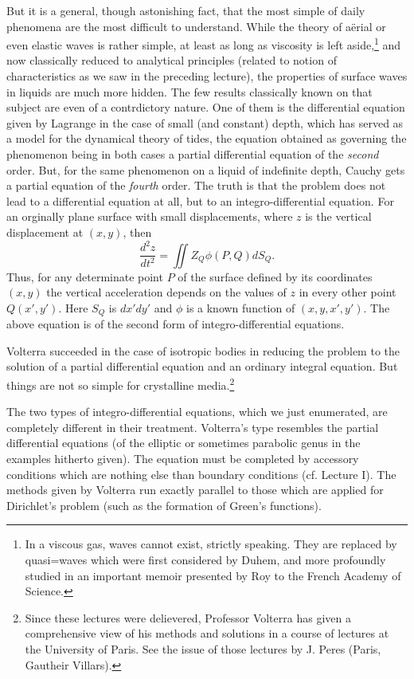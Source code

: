 \documentclass[12pt,oneside]{book}
\newcommand{\iit}[1]{\textit{#1}}
\begin{document}
But it is a general, though astonishing fact, that the most simple of daily phenomena are the most difficult to understand. While the theory of a\"erial or even elastic waves is rather simple, at least as long as viscosity is left aside,\footnote{In a viscous gas, waves cannot exist, strictly speaking. They are replaced by quasi=waves which were first considered by Duhem, and more profoundly studied in an important memoir presented by Roy to the French Academy of Science.} and now classically reduced to analytical principles (related to notion of characteristics as we saw in the preceding lecture), the properties of surface waves in liquids are much more hidden. The few results classically known on that subject are even of a contrdictory nature. One of them is the differential equation given by Lagrange in the case of small (and constant) depth, which has served as a model for the dynamical theory of tides, the equation obtained as governing the phenomenon being in both cases a partial differential equation of the \iit{second} order. But, for the same phenomenon on a liquid of indefinite depth, Cauchy gets a partial equation of the \iit{fourth} order. The truth is that the problem does not lead to a differential equation at all, but to an integro-differential equation. For an orginally plane surface with small displacements, where $z$ is the vertical displacement at $(x,y)$, then
\begin{equation*}
    \frac{d^2z}{dt^2}=\iint Z_Q\phi(P,Q)dS_Q.
\end{equation*}
Thus, for any determinate point $P$ of the surface defined by its coordinates $(x,y)$ the vertical acceleration depends on the values of $z$ in every other point $Q(x',y')$. Here $S_Q$ is $dx'dy'$ and $\phi$ is a known function of $(x,y,x',y')$. The above equation is of the second form of integro-differential equations. \par

Volterra succeeded in the case of isotropic bodies in reducing the problem to the solution of a partial differential equation and an ordinary integral equation. But things are not so simple for crystalline media.\footnote{Since these lectures were delievered, Professor Volterra has given a comprehensive view of his methods and solutions in a course of lectures at the University of Paris. See the issue of those lectures by J. Peres (Paris, Gautheir Villars).} \par

The two types of integro-differential equations, which we just enumerated, are completely different in their treatment. Volterra's type resembles the partial differential equations (of the elliptic or sometimes parabolic genus in the examples hitherto given). The equation must be completed by accessory conditions which are nothing else than boundary conditions (cf. Lecture I). The methods given by Volterra run exactly parallel to those which are applied for Dirichlet's problem (such as the formation of Green's functions). \par
\end{document}
